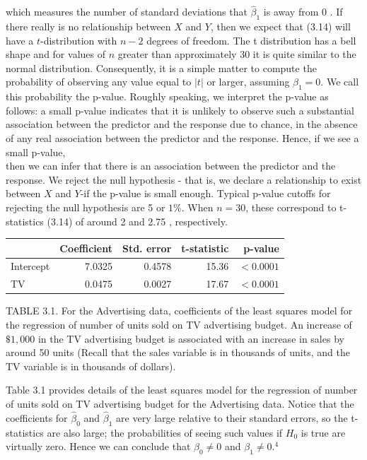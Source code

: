 \documentclass[10pt]{article}
\begin{document}
which measures the number of standard deviations that $\hat{\beta}_{1}$ is away from 0 . If there really is no relationship between $X$ and $Y$, then we expect that (3.14) will have a $t$-distribution with $n-2$ degrees of freedom. The t distribution has a bell shape and for values of $n$ greater than approximately 30 it is quite similar to the normal distribution. Consequently, it is a simple matter to compute the probability of observing any value equal to $|t|$ or larger, assuming $\beta_{1}=0$. We call this probability the p-value. Roughly speaking, we interpret the p-value as follows: a small p-value indicates that it is unlikely to observe such a substantial association between the predictor and the response due to chance, in the absence of any real association between the predictor and the response. Hence, if we see a small p-value,\\
then we can infer that there is an association between the predictor and the response. We reject the null hypothesis - that is, we declare a relationship to exist between $X$ and $Y$-if the p-value is small enough. Typical p-value cutoffs for rejecting the null hypothesis are 5 or $1 \%$. When $n=30$, these correspond to t-statistics (3.14) of around 2 and 2.75 , respectively.

\begin{center}
\begin{tabular}{l|rrrr}
\hline
 & Coefficient & Std. error & t-statistic & p-value \\
\hline
Intercept & 7.0325 & 0.4578 & 15.36 & $<0.0001$ \\
TV & 0.0475 & 0.0027 & 17.67 & $<0.0001$ \\
\hline
\end{tabular}
\end{center}

TABLE 3.1. For the Advertising data, coefficients of the least squares model for the regression of number of units sold on TV advertising budget. An increase of $\$ 1,000$ in the TV advertising budget is associated with an increase in sales by around 50 units (Recall that the sales variable is in thousands of units, and the TV variable is in thousands of dollars).

Table 3.1 provides details of the least squares model for the regression of number of units sold on TV advertising budget for the Advertising data. Notice that the coefficients for $\hat{\beta}_{0}$ and $\hat{\beta}_{1}$ are very large relative to their standard errors, so the t-statistics are also large; the probabilities of seeing such values if $H_{0}$ is true are virtually zero. Hence we can conclude that $\beta_{0} \neq 0$ and $\beta_{1} \neq 0 .{ }^{4}$
\end{document}
